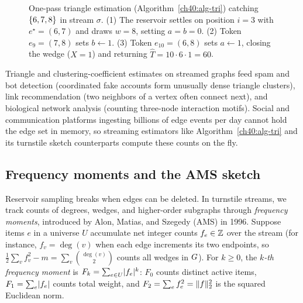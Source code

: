 \begin{figure}[htbp]
\caption{One-pass triangle estimation (Algorithm~\ref{ch40:alg-tri}) catching $\{6,7,8\}$ in stream $\sigma$. (1) The reservoir settles on position $i=3$ with $e^\star=(6,7)$ and draws $w=8$, setting $a=b=0$. (2) Token $e_9=(7,8)$ sets $b\gets 1$. (3) Token $e_{10}=(6,8)$ sets $a\gets 1$, closing the wedge ($X=1$) and returning $\widehat T = 10\cdot 6\cdot 1 = 60$.}
\label{ch40:fig-triangle-sample}
\end{figure}

\begin{applicationbox}
Triangle and clustering-coefficient estimates on streamed graphs feed spam and
bot detection (coordinated fake accounts form unusually dense triangle clusters),
link recommendation (two neighbors of a vertex often connect next), and
biological network analysis (counting three-node interaction motifs). Social and
communication platforms ingesting billions of edge events per day cannot hold
the edge set in memory, so streaming estimators like Algorithm~\ref{ch40:alg-tri}
and its turnstile sketch counterparts compute these counts on the fly.
\end{applicationbox}

\subsection{Frequency moments and the AMS sketch}
\label{ch40:ams}

Reservoir sampling breaks when edges can be deleted. In turnstile streams, we
track counts of degrees, wedges, and higher-order subgraphs through
\emph{frequency moments}, introduced by Alon, Matias, and Szegedy (AMS) in 1996.
Suppose items $e$ in a universe $U$ accumulate net integer counts $f_e \in \mathbb{Z}$
over the stream (for instance, $f_v = \deg(v)$ when each edge increments its two
endpoints, so $\frac{1}{2}\sum_v f_v^2 - m = \sum_v \binom{\deg(v)}{2}$ counts
all wedges in $G$). For $k \ge 0$, the \emph{$k$-th frequency moment} is
$F_k = \sum_{e\in U} \lvert f_e\rvert^k$: $F_0$ counts distinct active items,
$F_1 = \sum_e \lvert f_e\rvert$ counts total weight, and $F_2 = \sum_e f_e^2 = \lVert f\rVert_2^2$
is the squared Euclidean norm.

